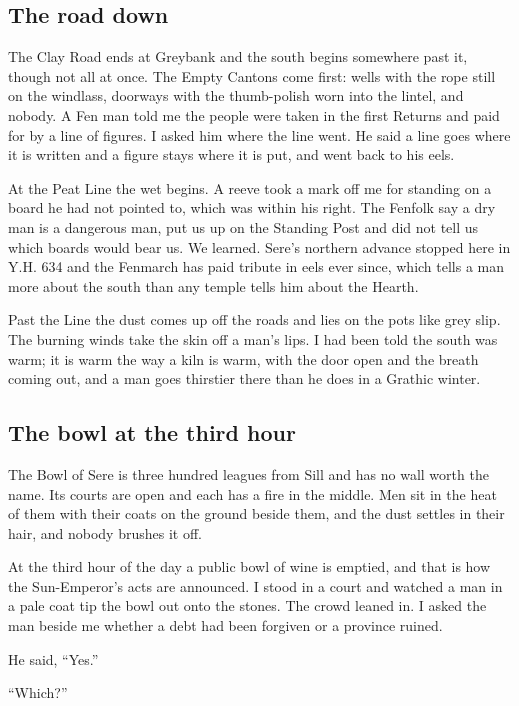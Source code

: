 \documentclass{design/chronicle}
\begin{document}
\subsection*{The road down}

The Clay Road ends at Greybank and the south begins somewhere past it, though not all at once. The Empty Cantons come first: wells with the rope still on the windlass, doorways with the thumb-polish worn into the lintel, and nobody. A Fen man told me the people were taken in the first Returns and paid for by a line of figures. I asked him where the line went. He said a line goes where it is written and a figure stays where it is put, and went back to his eels.

At the Peat Line the wet begins. A reeve took a mark off me for standing on a board he had not pointed to, which was within his right. The Fenfolk say a dry man is a dangerous man, put us up on the Standing Post and did not tell us which boards would bear us. We learned. Sere’s northern advance stopped here in Y.H. 634 and the Fenmarch has paid tribute in eels ever since, which tells a man more about the south than any temple tells him about the Hearth.

Past the Line the dust comes up off the roads and lies on the pots like grey slip. The burning winds take the skin off a man’s lips. I had been told the south was warm; it is warm the way a kiln is warm, with the door open and the breath coming out, and a man goes thirstier there than he does in a Grathic winter.

\subsection*{The bowl at the third hour}

The Bowl of Sere is three hundred leagues from Sill and has no wall worth the name. Its courts are open and each has a fire in the middle. Men sit in the heat of them with their coats on the ground beside them, and the dust settles in their hair, and nobody brushes it off.

At the third hour of the day a public bowl of wine is emptied, and that is how the Sun-Emperor’s acts are announced. I stood in a court and watched a man in a pale coat tip the bowl out onto the stones. The crowd leaned in. I asked the man beside me whether a debt had been forgiven or a province ruined.

He said, “Yes.”

“Which?”
\end{document}
